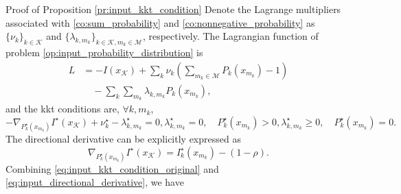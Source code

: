 \documentclass[journal]{IEEEtran}
\begin{document}
\begin{appendix}
	\begin{subsection}{Proof of Proposition \ref{pr:input_kkt_condition}}
		Denote the Lagrange multipliers associated with \eqref{co:sum_probability} and \eqref{co:nonnegative_probability} as $\{\nu_k\}_{k \in \mathcal{K}}$ and $\{\lambda_{k,m_k}\}_{k \in \mathcal{K},m_k \in \mathcal{M}}$, respectively.
		The Lagrangian function of problem \eqref{op:input_probability_distribution} is
		\begin{align}
			L
			 & = - I(x_{\mathcal{K}}) + \sum_k \nu_k \left( \sum_{m_k \in \mathcal{M}} P_k(x_{m_k}) - 1 \right)\nonumber \\
			 & \quad - \sum_k \sum_{m_k} \lambda_{k,m_k} P_k(x_{m_k}),
		\end{align}
		and the \gls{kkt} conditions are, $\forall k,m_k$,
		\begin{subequations}
			\label{eq:input_kkt_condition_original}
			\begin{equation}
				- \nabla_{P_k^\star(x_{m_k})} I^\star(x_{\mathcal{K}}) + \nu_k^\star - \lambda_{k,m_k}^\star = 0,
			\end{equation}
			\begin{equation}
				\lambda_{k,m_k}^\star = 0, \quad P_k^\star(x_{m_k}) > 0,
			\end{equation}
			\begin{equation}
				\lambda_{k,m_k}^\star \ge 0, \quad P_k^\star(x_{m_k}) = 0.
			\end{equation}
		\end{subequations}
		The directional derivative can be explicitly expressed as
		\begin{equation}
			\nabla_{P_k^\star(x_{m_k})} I^\star(x_{\mathcal{K}}) = I_k^\star(x_{m_k}) - (1 - \rho).
			\label{eq:input_directional_derivative}
		\end{equation}
		Combining \eqref{eq:input_kkt_condition_original} and \eqref{eq:input_directional_derivative}, we have

\end{subsection}
\end{appendix}
\end{document}

